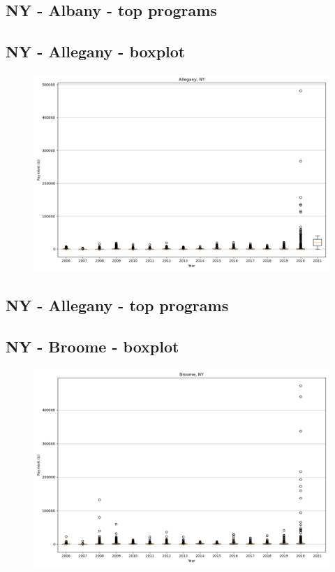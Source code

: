 \subsection*{NY - Albany - top programs}

\newpage
\subsection*{NY - Allegany - boxplot}
\begin{figure}[h]
\centering
\includegraphics[width=7in]{../output/boxplots/counties/Allegany-NY_boxplot.png}
\end{figure}


\subsection*{NY - Allegany - top programs}

\newpage
\subsection*{NY - Broome - boxplot}
\begin{figure}[h]
\centering
\includegraphics[width=7in]{../output/boxplots/counties/Broome-NY_boxplot.png}
\end{figure}


